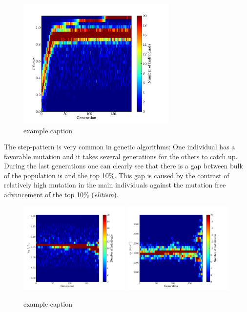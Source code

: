 \begin{figure}[htbp] %
   \centering
   \includegraphics[width=0.7\textwidth]{chapter_dalek/plots/plot_02bo_fit_evol.pdf} 
     \caption{example caption}
   \label{fig:fitness_evolution}
\end{figure}

The step-pattern is very common in genetic algorithms: One individual has a favorable mutation and it takes several generations for the others to catch up. During the last generations one can clearly see that there is a gap between bulk of the population is and the top 10\%. This gap is caused by the contrast of relatively high mutation in the main individuals against the mutation free advancement of the top 10\% (\textit{elitism}).


\begin{figure}[htbp] %
   \centering
   \includegraphics[width=0.49\textwidth]{chapter_dalek/plots/plot_02bo_lum_evol.pdf} 
   \includegraphics[width=0.49\textwidth]{chapter_dalek/plots/plot_02bo_vph_evol.pdf} 
   \caption{example caption}
   \label{fig:lumvph_evolution}
\end{figure}


